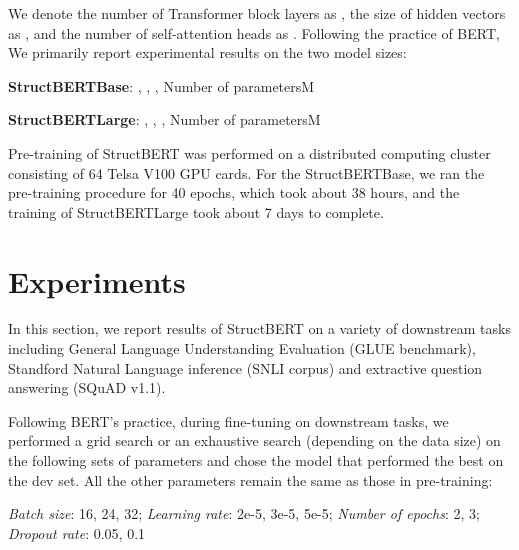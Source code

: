 \documentclass{article}
\begin{document}
We denote the number of Transformer block layers as , the size of hidden vectors as , and the number of self-attention heads as . Following the practice of BERT, We primarily report experimental results on the two model sizes:

{\bf StructBERT{\small Base}}: , , , Number of parametersM

{\bf StructBERT{\small Large}}: , , , Number of parametersM

Pre-training of StructBERT was performed on a distributed computing cluster consisting of 64 Telsa V100 GPU cards. For the StructBERT{\small Base}, we ran the pre-training procedure for 40 epochs, which took about 38 hours, and the training of StructBERT{\small Large} took about 7 days to complete.





















\section{Experiments}
In this section, we report results of StructBERT on a variety of downstream tasks including General Language Understanding Evaluation (GLUE benchmark), Standford Natural Language inference (SNLI corpus) and extractive question answering (SQuAD v1.1).

Following BERT's practice, during fine-tuning on downstream tasks, we performed a grid search or an exhaustive search (depending on the data size) on the following sets of parameters and chose the model that performed the best on the dev set. All the other parameters remain the same as those in pre-training:

{\small \emph{Batch size}: 16, 24, 32; 
\emph{Learning rate}: 2e-5, 3e-5, 5e-5; 
\emph{Number of epochs}: 2, 3; 
\emph{Dropout rate}: 0.05, 0.1}
\end{document}
